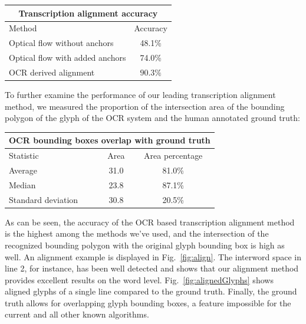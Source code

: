
\begin{center} \begin{tabular}{ |p{5cm}||c|  } \hline
	\multicolumn{2}{|c|}{\textbf{Transcription alignment accuracy}} \\
	\hline Method& Accuracy\\ \hline Optical flow without anchors&48.1\%\\
	Optical flow with added anchors&74.0\%\\ OCR derived alignment&
	$\mathbf{90.3\%}$\\ \hline \end{tabular} \end{center}

To further examine the performance of our leading transcription alignment
method, we measured the proportion of the intersection area of the bounding
polygon of the glyph of the OCR system and the human annotated ground truth: 


\begin{center} \begin{tabular}{ |p{3cm}||c|c| } \hline
	\multicolumn{3}{|c|}{\textbf{OCR bounding boxes overlap with ground
	truth}} \\ \hline Statistic&Area& Area percentage\\ \hline
	Average&31.0&81.0\%\\ Median&23.8&87.1\%\\ Standard
	deviation&30.8&20.5\%\\ \hline \end{tabular} \end{center}

As can be seen, the accuracy of the OCR based transcription alignment method is
the highest among the methods we've used, and the intersection of the
recognized bounding polygon with the original glyph bounding box is high as
well.  An alignment example is displayed in Fig.~\ref{fig:align}.  The
interword space in line 2, for instance, has been well detected and shows that
our alignment method provides excellent results on the word level.
Fig.~\ref{fig:alignedGlyphs} shows aligned glyphs of a single line compared to
the ground truth.  Finally, the ground truth allows for overlapping glyph
bounding boxes, a feature impossible for the current and all other known
algorithms.

